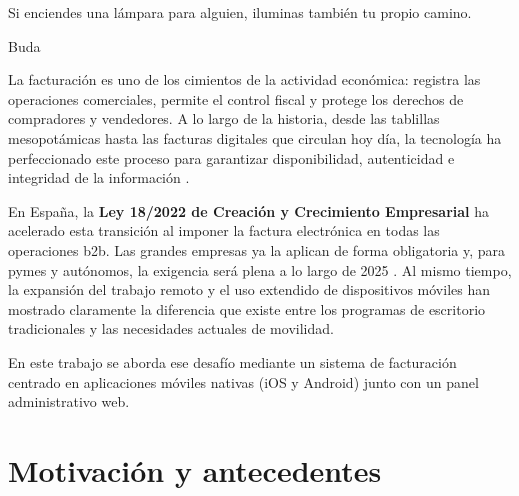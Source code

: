 \epigraph{Si enciendes una lámpara para alguien, iluminas también tu propio camino.}{Buda}

\begin{large}  
La facturación es uno de los cimientos de la actividad económica: registra las operaciones comerciales, permite el control fiscal y protege los derechos de compradores y vendedores. A lo largo de la historia, desde las tablillas mesopotámicas hasta las facturas digitales que circulan hoy día, la tecnología ha perfeccionado este proceso para garantizar disponibilidad, autenticidad e integridad de la información \cite{origen_facturas}.

En España, la \textbf{Ley 18/2022 de Creación y Crecimiento Empresarial} ha acelerado esta transición al imponer la factura electrónica en todas las operaciones \gls{b2b}. Las grandes empresas ya la aplican de forma obligatoria y, para pymes y autónomos, la exigencia será plena a lo largo de 2025 \cite{ley18_2022}. Al mismo tiempo, la expansión del trabajo remoto y el uso extendido de dispositivos móviles han mostrado claramente la diferencia que existe entre los programas de escritorio tradicionales y las necesidades actuales de movilidad.

En este trabajo se aborda ese desafío mediante un sistema de facturación centrado en aplicaciones móviles nativas (iOS y Android) junto con un panel administrativo web.
\end{large}

\section{Motivación y antecedentes}

